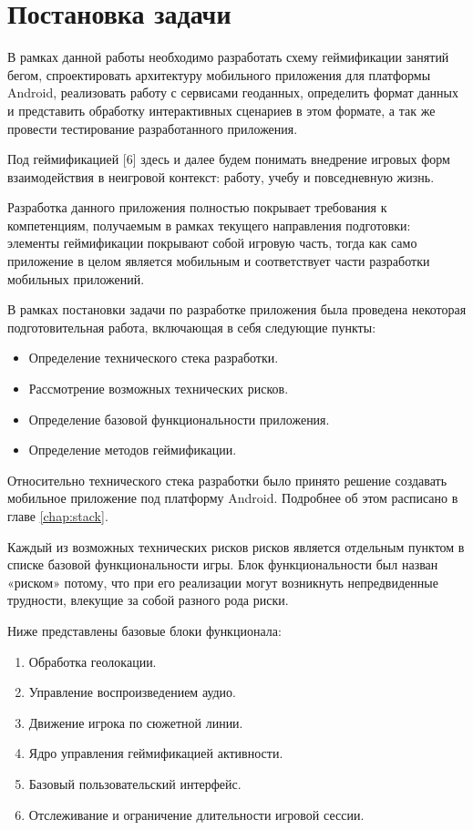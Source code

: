 \chapter{Постановка задачи}
В рамках данной работы необходимо разработать схему геймификации занятий бегом, спроектировать архитектуру мобильного приложения для платформы Android, реализовать работу с сервисами геоданных, определить формат данных и представить обработку интерактивных сценариев в этом формате, а так же провести тестирование разработанного приложения.

Под геймификацией [6] здесь и далее будем понимать внедрение игровых форм взаимодействия в неигровой контекст: работу, учебу и повседневную жизнь.

Разработка данного приложения полностью покрывает требования к компетенциям, получаемым в рамках текущего направления подготовки: элементы геймификации покрывают собой игровую часть, тогда как само приложение в целом является мобильным и соответствует части разработки мобильных приложений.

В рамках постановки задачи по разработке приложения была проведена некоторая подготовительная работа, включающая в себя следующие пункты:
\begin{itemize}
	\item Определение технического стека разработки.
	\item Рассмотрение возможных технических рисков.
	\item Определение базовой функциональности приложения.
	\item Определение методов геймификации.
\end{itemize}

Относительно технического стека разработки было принято решение создавать мобильное приложение под платформу Android. Подробнее об этом расписано в главе \autoref{chap:stack}.


Каждый из возможных технических рисков рисков является отдельным пунктом в списке базовой функциональности игры. Блок функциональности был назван «риском» потому, что при его реализации могут возникнуть непредвиденные трудности, влекущие за собой разного рода риски.

Ниже представлены базовые блоки функционала:
\begin{enumerate}
	\item Обработка геолокации.
	\item Управление воспроизведением аудио.
	\item Движение игрока по сюжетной линии.
	\item Ядро управления геймификацией активности.
	\item Базовый пользовательский интерфейс.
	\item Отслеживание и ограничение длительности игровой сессии.
\end{enumerate}

